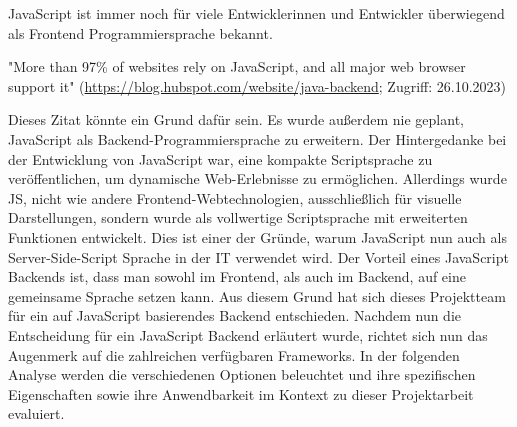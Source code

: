 JavaScript ist immer noch für viele Entwicklerinnen und Entwickler überwiegend als Frontend Programmiersprache bekannt. 

"More than 97\% of websites rely on JavaScript, and all major web browser support it"
(\url{https://blog.hubspot.com/website/java-backend}; Zugriff: 26.10.2023)

Dieses Zitat könnte ein Grund dafür sein. Es wurde außerdem nie geplant, JavaScript als Backend-Programmiersprache zu erweitern. Der Hintergedanke bei der Entwicklung von JavaScript war, eine kompakte Scriptsprache zu veröffentlichen, um dynamische Web-Erlebnisse zu ermöglichen. Allerdings wurde JS, nicht wie andere Frontend-Webtechnologien, ausschließlich für visuelle Darstellungen, sondern wurde als vollwertige Scriptsprache mit erweiterten Funktionen entwickelt. Dies ist einer der Gründe, warum JavaScript nun auch als Server-Side-Script Sprache in der IT verwendet wird.
\newline
Der Vorteil eines JavaScript Backends ist, dass man sowohl im Frontend, als auch im Backend, auf eine gemeinsame Sprache setzen kann. Aus diesem Grund hat sich dieses Projektteam für ein auf JavaScript basierendes Backend entschieden.
\newline
Nachdem nun die Entscheidung für ein JavaScript Backend erläutert wurde, richtet sich nun das Augenmerk auf die zahlreichen verfügbaren Frameworks. In der folgenden Analyse werden die verschiedenen Optionen beleuchtet und ihre spezifischen Eigenschaften sowie ihre Anwendbarkeit im Kontext zu dieser Projektarbeit evaluiert.
\cite{Backend_JavaScript}